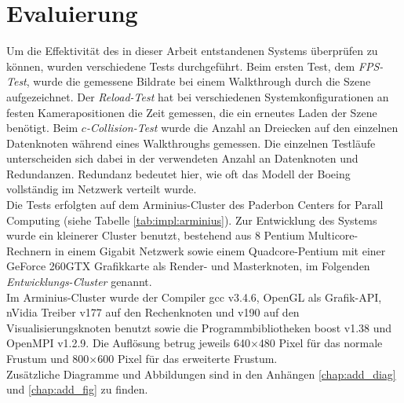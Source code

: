 \chapter{Evaluierung}
\label{chap:eval}
%
%

Um die Effektivität des in dieser Arbeit entstandenen Systems überprüfen zu können, wurden verschiedene Tests durchgeführt.
Beim ersten Test, dem \textit{FPS-Test}, wurde die gemessene Bildrate bei einem Walkthrough durch die Szene aufgezeichnet. Der \textit{Reload-Test} hat bei verschiedenen Systemkonfigurationen an festen Kamerapositionen die Zeit gemessen, die ein erneutes Laden der Szene benötigt. Beim \textit{$c$-Collision-Test} wurde die Anzahl an Dreiecken auf den einzelnen Datenknoten während eines Walkthroughs gemessen. Die einzelnen Testläufe unterscheiden sich dabei in der verwendeten Anzahl an Datenknoten und Redundanzen. Redundanz bedeutet hier, wie oft das Modell der Boeing vollständig im Netzwerk verteilt wurde. \\
Die Tests erfolgten auf dem Arminius-Cluster des Paderbon Centers for Parall Computing (siehe Tabelle \ref{tab:impl:arminius}). Zur Entwicklung des Systems wurde ein kleinerer Cluster benutzt, bestehend aus 8 Pentium Multicore-Rechnern in einem Gigabit Netzwerk sowie einem Quadcore-Pentium mit einer GeForce 260GTX Grafikkarte als Render- und Masterknoten, im Folgenden \textit{Entwicklungs-Cluster} genannt.\\
Im Arminius-Cluster wurde der Compiler gcc v3.4.6, OpenGL als Grafik-API, nVidia Treiber v177 auf den Rechenknoten und v190 auf den Visualisierungsknoten benutzt sowie die Programmbibliotheken boost v1.38 und OpenMPI v1.2.9. Die Auflösung betrug jeweils 640$\times$480 Pixel für das normale Frustum und 800$\times$600 Pixel für das erweiterte Frustum.\\
Zusätzliche Diagramme und Abbildungen sind in den Anhängen \ref{chap:add_diag} und \ref{chap:add_fig} zu finden.

